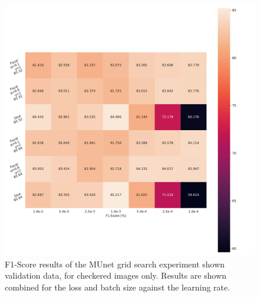\begin{figure}[H]
\begin{center}
    \includegraphics[width=\columnwidth]{imgs/munet_grid_heat_F1_C.pdf}
    \caption{F1-Score results of the \ac{MUnet} grid search experiment shown validation data, for checkered images only. Results are shown combined for the loss and batch size against the learning rate.}
    \label{fig:munet_f1c_heat}
\end{center}
\end{figure}

